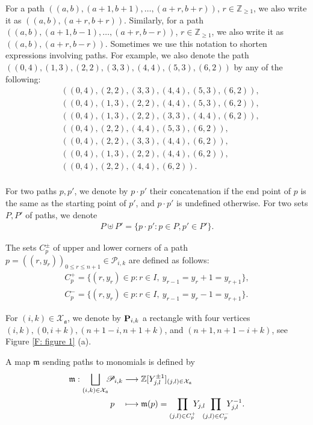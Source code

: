 \documentclass[12pt, reqno]{amsart}
\numberwithin{equation}{section}
\newcommand{\ZZ}{\mathbb{Z}}
\begin{document}
{For a path $((a, b), (a+1, b+1), \ldots, (a+r, b+r))$, $r \in \ZZ_{\ge 1}$, we also write it as $((a, b), (a+r, b+r))$. Similarly, for a path $((a, b), (a+1, b-1), \ldots, (a+r, b-r))$, $r \in \ZZ_{\ge 1}$, we also write it as $((a, b), (a+r, b-r))$. Sometimes we use this notation to shorten expressions involving paths. For example, we also denote the path $( (0, 4 ), (1, 3), (2, 2), (3, 3), (4, 4), (5, 3), (6, 2) )$ by any of the following: 
\begin{align*}
& ( (0, 4), (2, 2), (3, 3), (4, 4), (5, 3), (6, 2) ), \\
& ( (0, 4), (1, 3), (2, 2), (4, 4), (5, 3), (6, 2) ), \\
& ( (0, 4), (1, 3), (2, 2), (3, 3), (4, 4), (6, 2) ), \\
& ( (0, 4), (2, 2), (4, 4), (5, 3), (6, 2) ),\\
& ( (0, 4), (2, 2), (3, 3), (4, 4), (6, 2) ), \\
& ( (0, 4), (1, 3), (2, 2), (4, 4), (6, 2) ), \\
& ( (0, 4), (2, 2), (4, 4), (6, 2) ). \\ 
\end{align*} 

For two paths $p, p'$, we denote by $p \cdot p'$ their concatenation if the end point of $p$ is the same as the starting point of $p'$, and $p \cdot p'$ is undefined otherwise. For two sets $P, P'$ of paths, we denote 
\begin{align}\label{eq:concatenation of two sets of paths}
P \uplus P' = \{p \cdot p': p \in P, p' \in P' \}.
\end{align}


The sets $C_{p}^{\pm}$ of upper and lower corners of a path $p=((r,y_{r}))_{0\leq r \leq n+1}\in \mathscr{P}_{i,k}$ are defined as follows:
\begin{align*}
C^{+}_{p}=\{(r,y_{r})\in p: r\in I, \ y_{r-1}=y_{r}+1=y_{r+1}\},\\
C^{-}_{p}=\{(r,y_{r})\in p: r\in I, \ y_{r-1}=y_{r}-1=y_{r+1}\}.
\end{align*}

For $(i,k) \in \mathcal{X}_{\mathfrak{a}}$, we denote by ${\bf P}_{i,k}$ a rectangle with four vertices $(i,k), (0,i+k),(n+1-i,n+1+k)$, and $(n+1,n+1-i+k)$, see Figure \ref{F: figure 1} (a).

A map $\mathfrak{m}$ sending paths to monomials is defined by
\begin{align}\label{map: path to monomial}
\mathfrak{m}: \bigsqcup_{(i,k)\in \mathcal{X}_{\mathfrak{a}}}{\hskip -0.5em}\mathscr{P}_{i,k} & \longrightarrow \mathbb{Z}[Y_{j,l}^{\pm 1}]_{(j,l)\in \mathcal{X}_{\mathfrak{a}}} \nonumber \\
p\quad & \longmapsto  \mathfrak{m}(p)=\prod_{(j,l)\in C^{+}_{p}}{\hskip -0.5em}Y_{j,l}{\hskip -0.5em}\prod_{(j,l)\in C^{-}_{p}}{\hskip -0.5em}Y_{j,l}^{-1}.
\end{align}

}
\end{document}
